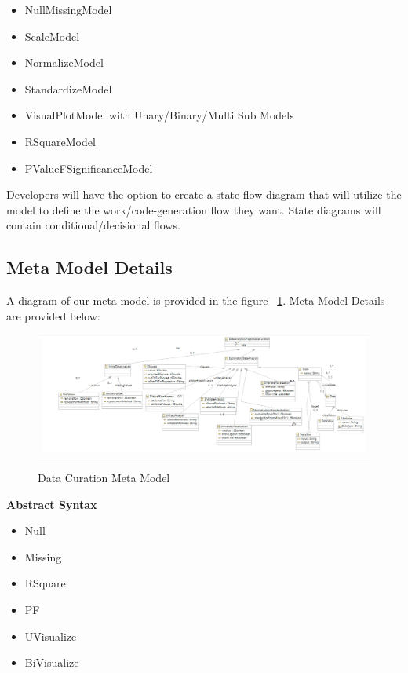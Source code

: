\begin{itemize}
	\item NullMissingModel
	\item ScaleModel
	\item NormalizeModel
	\item StandardizeModel
	\item VisualPlotModel with Unary/Binary/Multi Sub Models
	\item RSquareModel
	\item PValueFSignificanceModel
\end{itemize}


\flushleft \justify Developers will have the option to create a state flow diagram that will utilize the model to define the work/code-generation flow they want. State diagrams will contain conditional/decisional flows. 


\subsection{Meta Model Details}
\flushleft \justify A diagram of our meta model is provided in the figure ~\ref{data-curation-meta-model}. Meta Model Details are provided below:

\begin{figure}[!htb]
\begin{tabular}{c}
\includegraphics[scale=0.5]{images/meta-model-ecore-diagram.png} \\
\end{tabular}
\caption{Data Curation Meta Model}
\label{data-curation-meta-model}
\end{figure}


\textbf{Abstract Syntax}
\begin{itemize}
	\item Null
	\item Missing
	\item RSquare
	\item PF
	\item UVisualize
	\item BiVisualize
\end{itemize}



